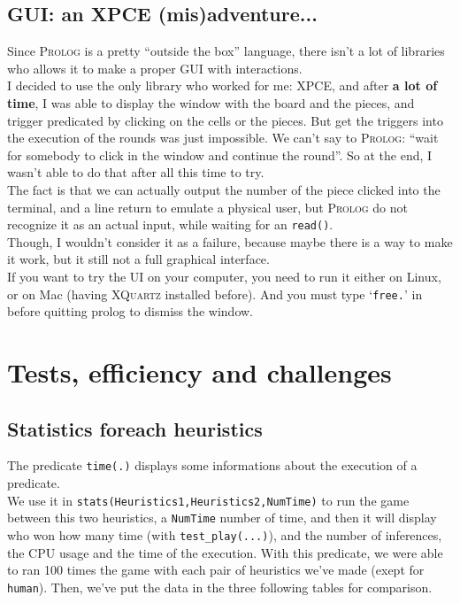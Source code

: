 \documentclass[a4paper,11pt]{article}
\newcommand{\tw}[1]{\texttt{#1}}
\begin{document}
		\subsection{GUI: an XPCE (mis)adventure...}
			Since \textsc{Prolog} is a pretty ``outside the box'' language, there isn't a lot of libraries who allows it to make a proper GUI with interactions. \\
			I decided to use the only library who worked for me: \textsc{XPCE}, and after \textbf{a lot of time}, I was able to display the window with the board and the pieces, and trigger predicated by clicking on the cells or the pieces. But get the triggers into the execution of the rounds was just impossible. We can't say to \textsc{Prolog}: ``wait for somebody to click in the window and continue the round''. So at the end, I wasn't able to do that after all this time to try. \\
			The fact is that we can actually output the number of the piece clicked into the terminal, and a line return to emulate a physical user, but \textsc{Prolog} do not recognize it as an actual input, while waiting for an \tw{read()}. \\
			Though, I wouldn't consider it as a failure, because maybe there is a way to make it work, but it still not a full graphical interface. \\
			If you want to try the UI on your computer, you need to run it either on Linux, or on Mac (having \textsc{XQuartz} installed before). And you must type `\tw{free.}' in before quitting prolog to dismiss the window.
	
	\section{Tests, efficiency and challenges}	
		\subsection{Statistics foreach heuristics}
			The predicate \tw{time(.)} displays some informations about the execution of a predicate. \\
			We use it in \tw{stats(Heuristics1,Heuristics2,NumTime)} to run the game between this two heuristics, a \tw{NumTime} number of time, and then it will display who won how many time (with \tw{test\_play(...)}), and the number	of inferences, the CPU usage and the time of the execution. With this predicate, we were able to ran 100 times the game with each pair of heuristics we've made (exept for \tw{human}). Then, we've put the data in the three following tables for comparison.
\end{document}
